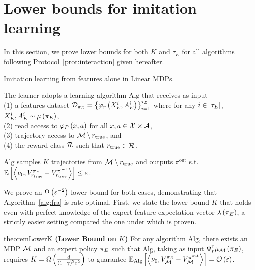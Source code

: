 \section{Lower bounds for imitation learning}
\label{app:lower}
In this section, we prove lower bounds for both $K$ and $\tau_E$ for all algorithms following Protocol~\ref{prot:interaction} given hereafter.
%
\begin{protocol}[!h]
    \caption{Imitation learning from features alone in Linear MDPs. \label{prot:interaction}}
    \centering
    \begin{algorithmic}[1]
        \STATE The learner adopts a learning algorithm $\mathrm{Alg}$ that receives as input \\
        (1) a features dataset $\mathcal{D}_{\pi_E} = \left\{ \varphi_r \left( X^i_E, A^i_E \right) \right\}_{i=1}^{\tau_E}$ where for any $i \in \left[ \tau_E \right]$, $X^i_E, A^i_E \sim \mu \left( {\pi_E} \right)$, \\
        (2) read access to $\varphi_P \left( x, a \right)$ for all $x, a \in \mathcal{X} \times \mathcal{A}$, \\
        (3) trajectory access to $\mathcal{M} \setminus r_{\textup{true}}$, and \\
        (4) the reward class $\mathcal{R}$ such that $r_{\textup{true}} \in \mathcal{R}$.
        
        \STATE $\mathrm{Alg}$ samples $K$ trajectories from $\mathcal{M} \setminus r_{\textup{true}}$ and outputs $\pi^{\mathrm{out}}$ s.t. $\mathbb{E} \left[ \left\langle \nu_0, V_{r_{\textup{true}}}^{\pi_E} - V_{r_{\textup{true}}}^{\pi^{\mathrm{out}}} \right\rangle \right] \leq \varepsilon$.
    \end{algorithmic}
\end{protocol}

We prove an $\Omega \left( \varepsilon^{-2} \right)$ lower bound for both cases, demonstrating that Algorithm~\ref{alg:fra} is rate optimal. First, we state the lower bound $K$ that holds even with perfect knowledge of the expert feature expectation vector $\lambda \left( {\pi_E} \right)$, a strictly easier setting compared the one under which  is proven.
%
\begin{restatable}{theorem}{LowerK} \textbf{(Lower Bound on $K$)} \label{thm:LowerK}
    For any algorithm $\mathrm{Alg}$, there exists an MDP $\mathcal{M}$ and an expert policy ${\pi_E}$ such that $\mathrm{Alg}$, taking as input $ \Phi_r^\mathsf{\scriptscriptstyle T} \mu_{\mathcal{M}} \left( {\pi_E} \right)$, requires $K = \Omega \left( \frac{d}{\left( 1 - \gamma \right)^2 \varepsilon^2} \right)$ to guarantee $\mathbb{E}_{\mathrm{Alg}} \left[ \left\langle \nu_0, V_{\mathcal{M}}^{{\pi_E}} - V_{\mathcal{M}}^{\pi^{\mathrm{out}}} \right\rangle \right] = \mathcal{O} \left( \varepsilon \right)$.
\end{restatable}

